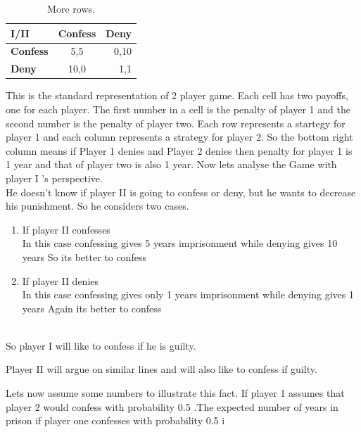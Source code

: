 \begin{table}[h!]
  \begin{center}
    \caption{More rows.}
    \label{tab:table1}
    \begin{tabular}{l|S|r}
      \textbf{I/II} & \textbf{Confess} & \textbf{Deny}\\
      \hline
      \textbf{Confess} & 5,5 & 0,10\\
      \textbf{Deny} & 10,0 & 1,1\\
    \end{tabular}
  \end{center}
\end{table}
This is the standard representation of 2 player game. Each cell has  two payoffs, one for each player. The first  number in a cell is the penalty of player 1 and the second number is the penalty of player two. Each row represents a startegy for player 1 and each column represents a strategy for player 2. So the bottom right column means if Player 1 denies and Player 2 denies then  penalty for player 1 is 1 year and that of player two is also 1 year.
Now lets analyse the Game with player I 's perspective.
\\
He doesn't know if player II is going to confess or deny, but he wants to decrease his punishment. So he considers two cases.\\
\begin{enumerate}
    \item  If player II confesses \\
    In this case confessing gives 5 years imprisonment while denying gives 10 years 
    So its better to confess
    \item  If player II denies \\
   In this case confessing gives only 1 years imprisonment while denying gives 1 years 
   Again its better to confess
\end{enumerate} \\
So player I will like to confess if he is guilty.

Player II will argue on similar lines and will also like to confess if guilty.

Lets now assume some numbers to illustrate this fact. If player 1 assumes that player 2 would confess with probability  0.5 .The expected number of years in prison if player one confesses with probability 0.5 i

